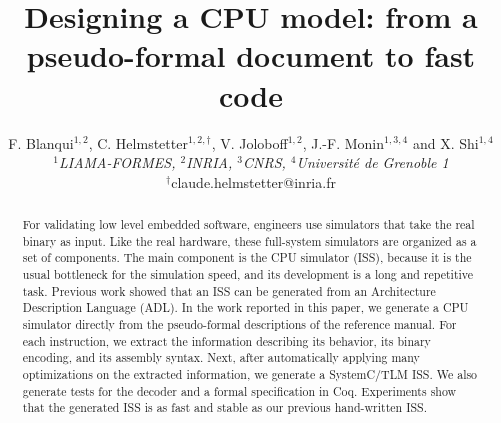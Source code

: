 \documentclass[conference]{ieeeconf}
\begin{document}
\title{Designing a CPU model: from a pseudo-formal document to fast code}

\author{%
\parbox{15cm}{\centering
  F. Blanqui$^{1,2}$, C. Helmstetter$^{1,2,\dag}$, V. Joloboff$^{1,2}$, J.-F. Monin$^{1,3,4}$ and X. Shi$^{1,4}$\\[1ex]
  {\small\itshape $^1$LIAMA-FORMES, $^2$INRIA, $^3$CNRS, $^4$Universit\'{e} de Grenoble 1}\\
  $^\dag$claude.helmstetter@inria.fr
}
}

\maketitle

\begin{abstract}
  For validating low level embedded software, engineers use simulators
  that take the real binary as input. Like the real hardware, these
  full-system simulators are organized as a set of components. The main
  component is the CPU simulator (ISS), because it is the usual
  bottleneck for the simulation speed, and its development is a long
  and repetitive task. Previous work showed that an ISS can
  be generated from an Architecture Description Language (ADL).  In
  the work reported in this paper, we generate a CPU simulator
  directly from the pseudo-formal descriptions of the reference
  manual. For each instruction, we extract the information describing
  its behavior, its binary encoding, and its assembly syntax. Next,
  after automatically applying many optimizations on the extracted
  information, we generate a SystemC/TLM ISS. We also
  generate tests for the decoder and a formal specification in
  Coq. Experiments show that the generated ISS is as fast and stable
  as our previous hand-written ISS.
\end{abstract}
\end{document}
